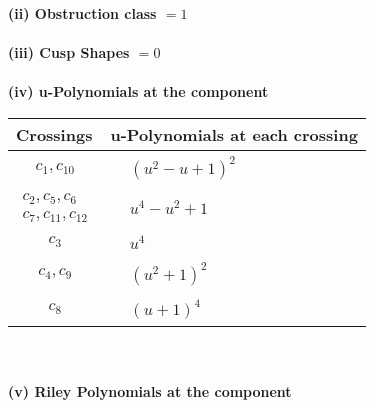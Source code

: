 \documentclass[1p]{elsarticle_modified}
\theoremstyle{definition}
\begin{document}
\flushleft \textbf{(ii) Obstruction class $= 1$}\\~\\
\flushleft \textbf{(iii) Cusp Shapes $= 0$}\\~\\
\newpage\renewcommand{\arraystretch}{1}
\flushleft \textbf{(iv) u-Polynomials at the component}\newline \\
\begin{tabular}{m{50pt}|m{274pt}}
Crossings & \hspace{64pt}u-Polynomials at each crossing \\
\hline $$\begin{aligned}c_{1},c_{10}\end{aligned}$$&$\begin{aligned}
&(u^2- u+1)^2
\end{aligned}$\\
\hline $$\begin{aligned}c_{2},c_{5},c_{6}\\c_{7},c_{11},c_{12}\end{aligned}$$&$\begin{aligned}
&u^4- u^2+1
\end{aligned}$\\
\hline $$\begin{aligned}c_{3}\end{aligned}$$&$\begin{aligned}
&u^4
\end{aligned}$\\
\hline $$\begin{aligned}c_{4},c_{9}\end{aligned}$$&$\begin{aligned}
&(u^2+1)^2
\end{aligned}$\\
\hline $$\begin{aligned}c_{8}\end{aligned}$$&$\begin{aligned}
&(u+1)^4
\end{aligned}$\\
\hline
\end{tabular}\\~\\
\newpage\renewcommand{\arraystretch}{1}
\flushleft \textbf{(v) Riley Polynomials at the component}\newline \\
\end{document}
